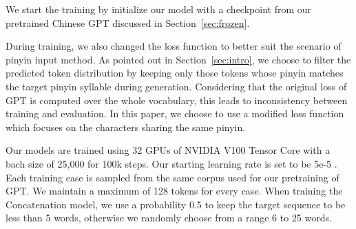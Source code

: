 We start the training by initialize our model with a checkpoint from our pretrained Chinese GPT discussed in Section~\ref{sec:frozen}.

During training, we also changed the loss function to better suit the scenario of pinyin input method.
As pointed out in Section~\ref{sec:intro}, we choose to filter the predicted token distribution by keeping only those tokens whose pinyin matches the target pinyin syllable during generation.
Considering that the original loss of GPT is computed over the whole vocabulary, this leads to inconsistency between training and evaluation.
In this paper, we choose to use a modified loss function which focuses on the characters sharing the same pinyin.


Our models are trained using 32 GPUs of NVIDIA V100 Tensor Core with a bach size of 25,000 for 100k steps.
Our starting learning rate is set to be 5e-5 .
Each training case is sampled from the same corpus used for our pretraining of GPT.
We maintain a maximum of 128 tokens for every case.
When training the Concatenation model, we use a probability 0.5 to keep the target sequence to be less than 5 words, otherwise we randomly choose from a range 6 to 25 words.
